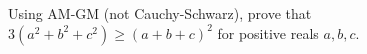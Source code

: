 Using AM-GM (not Cauchy-Schwarz), prove that $3(a^2+b^2+c^2)\ge(a+b+c)^2$ for positive reals $a,b,c$.
